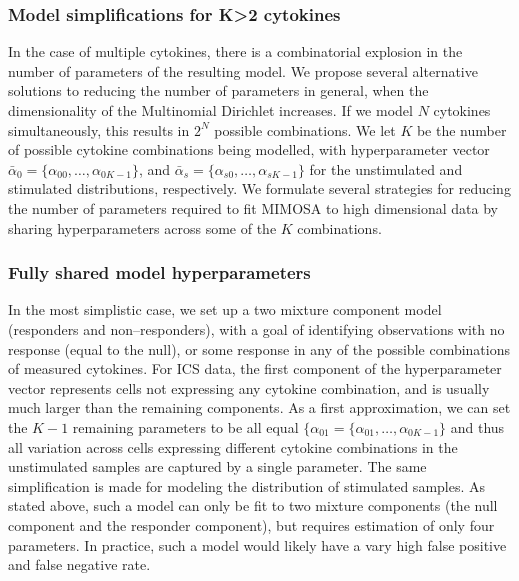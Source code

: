 \documentclass[11pt]{article}
\begin{document}
\subsubsection*{Model simplifications for K>2 cytokines}
In the case of multiple cytokines, there is a combinatorial explosion in the number of parameters of the resulting model. We propose several alternative solutions to reducing the number of parameters in general, when the dimensionality of the Multinomial Dirichlet increases. If we model $N$ cytokines simultaneously, this results in $2^N$ possible combinations. We let $K$ be the number of possible cytokine combinations being modelled, with hyperparameter vector $\bar{\alpha}_0=\{\alpha_{00},\ldots,\alpha_{0K-1}\}$, and $\bar{\alpha}_s=\{\alpha_{s0},\ldots,\alpha_{sK-1}\}$ for the unstimulated and stimulated distributions, respectively. We formulate several strategies for reducing the number of parameters required to fit MIMOSA to high dimensional data by sharing hyperparameters across some of the $K$ combinations.

\subsubsection*{Fully shared model hyperparameters}
In the most simplistic case, we set up a two mixture component model (responders and non--responders), with a goal of identifying observations with no response (equal to the null), or some response in any of the possible combinations of measured cytokines. For ICS data, the first component of the hyperparameter vector represents cells not expressing any cytokine combination, and is usually much larger than the remaining components. As a first approximation, we can set the $K-1$ remaining parameters to be all equal $\{\alpha_{01}=\{\alpha_{01},\ldots,\alpha_{0K-1}\}$ and thus all variation across cells expressing different cytokine combinations in the unstimulated samples are captured by a single parameter. The same simplification is made for modeling the distribution of stimulated samples. As stated above, such a model can only be fit to two mixture components (the null component and the responder component), but requires estimation of only four parameters. In practice, such a model would likely have a vary high false positive and false negative rate.
\end{document}
